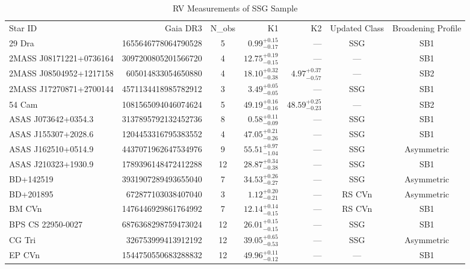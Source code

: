 \begin{table}[htbp]
\begin{minipage}{\textwidth}

\centering
\caption{RV Measurements of SSG Sample}
\label{tab:rv_table}
\fontsize{5.5pt}{6.5pt}\selectfont

\setlength{\tabcolsep}{3pt}
\begin{tabular}{lrcrrcc} 
\hline
Star ID & Gaia DR3 & N_obs & K1 & K2 & Updated Class & Broadening Profile \\
29 Dra & 1655646778064790528 & 5 & $0.99^{+0.15}_{-0.17}$ & --- & SSG & SB1 \\
 2MASS J08171221+0736164 & 3097200805201566720 & 4 & $12.75^{+0.19}_{-0.15}$ & --- & --- & SB1 \\
 2MASS J08504952+1217158 & 605014833054650880 & 4 & $18.10^{+0.32}_{-0.38}$ & $4.97^{+0.37}_{-0.57}$ & --- & SB2 \\
 2MASS J17270871+2700144 & 4571134418985782912 & 3 & $3.49^{+0.05}_{-0.05}$ & --- & SSG & SB1 \\
 54 Cam & 1081565094046074624 & 5 & $49.19^{+0.16}_{-0.16}$ & $48.59^{+0.25}_{-0.23}$ & --- & SB2 \\
 ASAS J073642+0354.3 & 3137895792132452736 & 8 & $0.58^{+0.11}_{-0.09}$ & --- & SSG & SB1 \\
 ASAS J155307+2028.6 & 1204453316795383552 & 4 & $47.05^{+0.21}_{-0.26}$ & --- & SSG & SB1 \\
 ASAS J162510+0514.9 & 4437071962647534976 & 9 & $55.51^{+0.97}_{-1.04}$ & --- & SSG & Asymmetric \\
 ASAS J210323+1930.9 & 1789396148472412288 & 12 & $28.87^{+0.34}_{-0.38}$ & --- & SSG & SB1 \\
 BD+142519 & 3931907289493655040 & 7 & $34.53^{+0.26}_{-0.27}$ & --- & SSG & Asymmetric \\
 BD+201895 & 672877103038407040 & 3 & $1.12^{+0.20}_{-0.21}$ & --- & RS CVn & Asymmetric \\
 BM CVn & 1476446929861764992 & 7 & $12.14^{+0.14}_{-0.15}$ & --- & RS CVn & SB1 \\
 BPS CS 22950-0027 & 6876368298759473024 & 12 & $26.01^{+0.15}_{-0.15}$ & --- & SSG & SB1 \\
 CG Tri & 326753999413912192 & 12 & $39.05^{+0.65}_{-0.53}$ & --- & SSG & Asymmetric \\
 EP CVn & 1544750550683288832 & 12 & $49.96^{+0.11}_{-0.12}$ & --- & --- & SB1 \\

\end{tabular}
\end{minipage}
\end{table}
